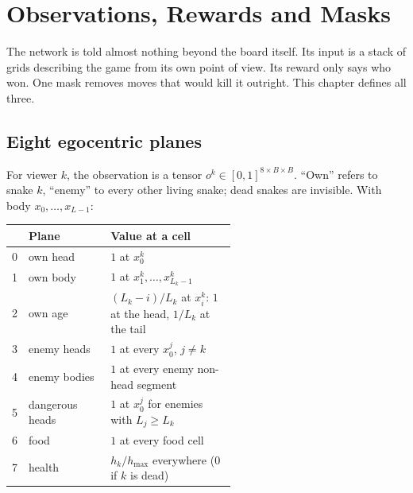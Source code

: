 \chapter{Observations, Rewards and Masks}\label{ch:obs}

The network is told almost nothing beyond the board itself. Its input is a stack of grids
describing the game from its own point of view. Its reward only says who won. One
mask removes moves that would kill it outright. This chapter defines all three.

\section{Eight egocentric planes}

\begin{defbox}[Observation]
For viewer $k$, the observation is a tensor $o^k\in[0,1]^{8\times B\times B}$. ``Own''
refers to snake $k$, ``enemy'' to every other living snake; dead snakes are invisible.
With body $x_0,\dots,x_{L-1}$:
\begin{center}
\begin{tabular}{@{}clp{0.56\linewidth}@{}}
\toprule
& \textbf{Plane} & \textbf{Value at a cell}\\
\midrule
0 & own head & $1$ at $x^k_0$\\
1 & own body & $1$ at $x^k_1,\dots,x^k_{L_k-1}$\\
2 & own age & $(L_k-i)/L_k$ at $x^k_i$: $1$ at the head, $1/L_k$ at the tail\\
3 & enemy heads & $1$ at every $x^j_0$, $j\ne k$\\
4 & enemy bodies & $1$ at every enemy non-head segment\\
5 & dangerous heads & $1$ at $x^j_0$ for enemies with $L_j \ge L_k$\\
6 & food & $1$ at every food cell\\
7 & health & $h_k/h_{\max}$ everywhere (0 if $k$ is dead)\\
\bottomrule
\end{tabular}
\end{center}
\end{defbox}

